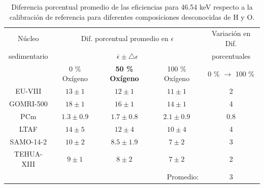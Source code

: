 \begin{table}[h]
\centering
\caption{Diferencia porcentual promedio de las eficiencias para 46.54 keV respecto a la calibración de referencia para diferentes composiciones desconocidas de H y O.}\label{Tabla-Eficiencias}
\begin{tabular}{|c|c|c|c|c|}\hline
\rowcolor{Blue3}	Núcleo 	&	 \multicolumn{3}{c|}{Dif. porcentual promedio en $\epsilon$}           					&	Variación en Dif. 	\\ 	
\rowcolor{Blue3}	 sedimentario & \multicolumn{3}{c|}{$\overline{\epsilon} \pm \bigtriangleup \epsilon$}   & porcentuales \\	\hline
\rowcolor{Blue2}		&	0 \% Oxígeno 	&	\textbf{50 \% Oxígeno} 	&	100 \% Oxígeno 	&	0 \%  $\rightarrow$ 100 \% 	\\  \hline
\rowcolor{Blue1}	EU-VIII	&	$13 \pm 1$	&	$12 \pm 1$	&	$11 \pm 1$	&	2	\\ 	
\rowcolor{Blue1}	GOMRI-500	&	$18 \pm 1$	&	$16 \pm 1$	&	$14 \pm 1$	&	4	\\ 	
\rowcolor{Blue1}	PCm	&	$1.3 \pm 0.9$	&	$1.7 \pm 0.8$	&	$2.1 \pm 0.9$	&	0.8	\\ 	
\rowcolor{Blue1}	LTAF	&	$14 \pm 5$	&	$12 \pm 4$	&	$10 \pm 4$	&	4	\\ 	
\rowcolor{Blue1}	SAMO-14-2	&	$10 \pm 2$	&	$8.5 \pm 1.9$	&	$7 \pm 2$	&	3	\\ 	
\rowcolor{Blue1}	TEHUA-XIII	&	$9 \pm 1$	&	$8 \pm 2$	&	$7 \pm 2$	&	2	\\ 	\hline
\rowcolor{Blue2}	 & \multicolumn{3}{r|}{Promedio:} 							&	3	\\ 	\hline
\end{tabular}
\end{table}	
\newpage
